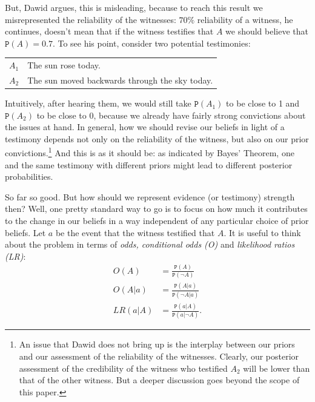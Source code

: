 \documentclass{ifcolog}
\newcommand{\pr}[1]{\mbox{$\mathtt{P}(#1)$}}
\newcommand{\n}{\neg}
\begin{document}
  But, Dawid argues,  this is misleading, because to reach this result we misrepresented the reliability of the witnesses: $70\%$ reliability of a witness, he continues, doesn't  mean that if the witness testifies that $A$ we should believe that  $\pr{A}=0.7$. To see his point,  consider two potential testimonies:




\begin{center}
\begin{tabular}
{@{}ll@{}}
\toprule
  $A_1$ & The sun rose today. \\
   $A_2$ & The sun moved backwards through the sky today.\\
\bottomrule
\end{tabular}
\end{center}

\noindent     Intuitively, after hearing them, we would still take $\pr{A_1}$ to be close to 1 and $\pr{A_2}$ to be close to 0, because we already have fairly strong convictions about the issues at hand. In general, how we should revise our beliefs  in light of a testimony depends not only on the reliability of the witness, but also on our prior convictions.\footnote{An issue that Dawid does not bring up is the interplay between our priors and our assessment of the reliability of the witnesses. Clearly, our posterior assessment of the credibility of the witness who testified $A_2$ will be lower than that of the other witness. But a deeper discussion goes beyond the scope of this paper.}  And this is as it should be:  as indicated by Bayes' Theorem,  one and the same testimony with different priors might lead to different posterior probabilities.



 So far so good. But how should we represent evidence (or testimony) strength then? Well, one pretty standard way to go is to  focus on how much it contributes to the change in our beliefs in a way independent of any particular choice of prior beliefs. 
 Let $a$ be the event that the  witness testified that $A$.  It is useful to think about the problem in terms of \emph{odds, conditional odds (O)} and \emph{likelihood ratios (LR)}:
 \begin{align*} O(A)  & = \frac{\pr{A}}{\pr{\n A}}\\
 O(A\vert a) &= \frac{\pr{A\vert a}}{\pr{\n A \vert a}}  \\
 LR(a\vert A) &= \frac{\pr{a\vert A}}{\pr{a\vert \n A}}. 
\end{align*}
\end{document}
